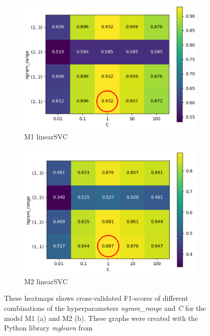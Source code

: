 \begin{figure}[h!]
 \begin{subfigure}{0.5\textwidth}
   \centering
   \includegraphics[width=0.9\linewidth]{img/m1_F1_ngram_C_heatmap_w_Circle.pdf}
   \caption{M1 linearSVC}
   \label{fig:m1_heatmap}
\end{subfigure}
\begin{subfigure}{0.5\textwidth}
   \centering
   \includegraphics[width=0.9\linewidth]{img/m2_ngram_C_heatmap_new_w_circle.pdf}
   \caption{M2 linearSVC}
   \label{fig:m2_heatmap}
 \end{subfigure}
\caption{These heatmaps shows cross-validated F1-scores of different combinations of the hyperparameters \textit{ngram\_range} and \textit{C} for the model M1 (a) and M2 (b). These graphs were created with the Python library \textit{mglearn} from \parencite{Guido2016}}
\label{fig:heatmaps}
\end{figure}


